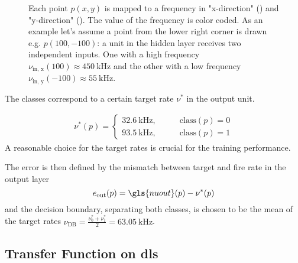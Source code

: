 \begin{figure}
	\begin{subfigure}[c]{0.5\textwidth}
		\centering
		\caption{}
		\label{nuxinput}
	\end{subfigure}
	\begin{subfigure}[c]{0.5\textwidth}
		\centering
		\caption{}
		\label{nuyinput}
	\end{subfigure}
	\caption{Each point $p(x,y)$ is mapped to a frequency in "x-direction" () and "y-direction" (). The value of the frequency is color coded. As an example let's assume a point from the lower right corner is drawn e.g. $p(100,-100)$: a unit in the hidden layer receives two independent inputs. One with a high frequency $\nu_{\text{in, x}}(100) \approx \SI{450}{\kilo \Hz}$ and the other with a low frequency $\nu_{\text{in, y}}(-100) \approx \SI{55}{\kilo \Hz}$.}
	\label{circlesinputs}

\end{figure}

The classes correspond to a certain target rate $\nu^*$ in the output unit.

\begin{align}
\label{circlestarget}
\nu^*(p) =
\begin{cases}
\SI{32.6}{\kilo \Hz} ,&\quad \quad \text{class}(p) = 0\\
\SI{93.5}{\kilo \Hz} ,&\quad \quad \text{class}(p) = 1
\end{cases}
\end{align}
A reasonable choice for the target rates is crucial for the training performance.

The error is then defined by the mismatch between target and fire rate in the output layer
\begin{equation}
e_\text{out}(p) = \gls{nuout}(p) - \nu^*(p)
\end{equation}
and the decision boundary, separating both classes, is chosen to be the mean of the target rates $\nu_\text{DB} = \frac{\nu_0^* + \nu_1^*}{2} = \SI{63.05}{\kilo \Hz}$.

\subsection{Transfer Function on \gls{dls}}



